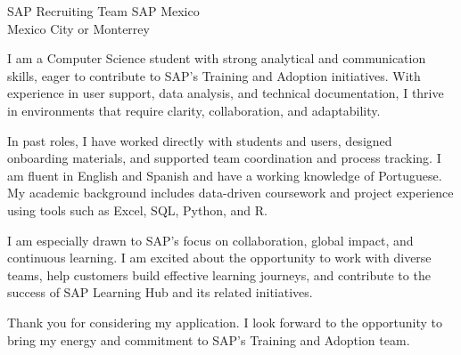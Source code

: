 \documentclass[11pt, a4paper]{awesome-cv}
\begin{document}
\makecvheader

\recipient
  {SAP Recruiting Team}
  {SAP Mexico\\Mexico City or Monterrey}

\begin{cvletter}
I am a Computer Science student with strong analytical and communication skills, eager to contribute to SAP’s Training and Adoption initiatives. With experience in user support, data analysis, and technical documentation, I thrive in environments that require clarity, collaboration, and adaptability.

In past roles, I have worked directly with students and users, designed onboarding materials, and supported team coordination and process tracking. I am fluent in English and Spanish and have a working knowledge of Portuguese. My academic background includes data-driven coursework and project experience using tools such as Excel, SQL, Python, and R.

I am especially drawn to SAP’s focus on collaboration, global impact, and continuous learning. I am excited about the opportunity to work with diverse teams, help customers build effective learning journeys, and contribute to the success of SAP Learning Hub and its related initiatives.

Thank you for considering my application. I look forward to the opportunity to bring my energy and commitment to SAP’s Training and Adoption team.
\end{cvletter}


\makeletterclosing
\end{document}
